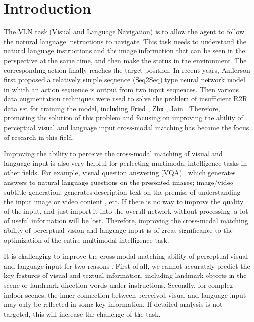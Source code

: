 \section{Introduction}
\label{intro}
	
The VLN task (Visual and Language Navigation) is to allow the agent to follow the natural language instructions to navigate. This task needs to understand the natural language instructions and the image information that can be seen in the perspective at the same time, and then make the status in the environment. The corresponding action finally reaches the target position. In recent years, Anderson \cite{anderson2018vision} first proposed a relatively simple sequence (Seq2Seq) type neural network model in which an action sequence is output from two input sequences. Then various data augmentation techniques were used to solve the problem of insufficient R2R data set for training the model, including Fried \cite{fried2018speaker}, Zhu \cite{zhu20201vision}, Jain \cite{jain2019stay}. Therefore, promoting the solution of this problem and focusing on improving the ability of perceptual visual and language input cross-modal matching has become the focus of research in this field.

Improving the ability to perceive the cross-modal matching of visual and language input is also very helpful for perfecting multimodal intelligence tasks in other fields. For example, visual question answering (VQA) \cite{antol2015vqa}, which generates answers to natural language questions on the presented images; image/video subtitle generation, generates description text on the premise of understanding the input image or video content \cite{das2017visual}, etc. If there is no way to improve the quality of the input, and just import it into the overall network without processing, a lot of useful information will be lost. Therefore, improving the cross-modal matching ability of perceptual vision and language input is of great significance to the optimization of the entire multimodal intelligence task.

It is challenging to improve the cross-modal matching ability of perceptual visual and language input for two reasons \cite{fried2018speaker,landi2019embodied,hwang2021joint}. First of all, we cannot accurately predict the key features of visual and textual information, including landmark objects in the scene or landmark direction words under instructions. Secondly, for complex indoor scenes, the inner connection between perceived visual and language input may only be reflected in some key information. If detailed analysis is not targeted, this will increase the challenge of the task.
	
